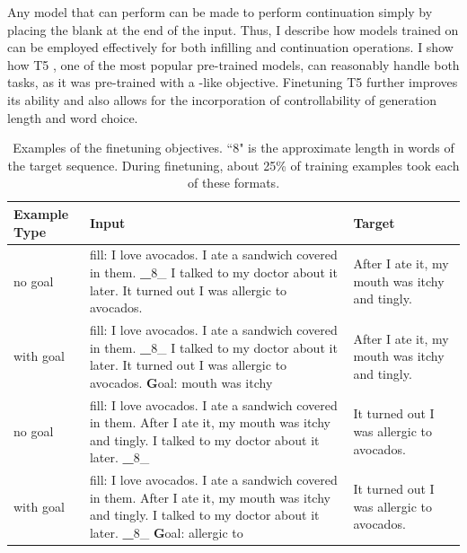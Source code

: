 Any model that can perform \FitB{} can be made to perform continuation simply by placing the blank at the end of the input.
Thus, I describe how models trained on \FitB{} can be employed effectively for both infilling and continuation operations.
I show how T5 \citep{raffel2019exploring}, one of the most popular pre-trained models, can reasonably handle both tasks, as it was pre-trained with a \FitB-like objective.
Finetuning T5 further improves its ability and also allows for the incorporation of controllability of generation length and word choice.


\begin{table}[t]
  \centering
  \small
  \caption{Examples of the finetuning objectives. ``8" is the approximate length in words of the target sequence. During finetuning, about 25\% of training examples took each of these formats.}
    \begin{tabular}{p{}p{}p{}}
    \midrule
    Example Type & Input & Target \\
    \midrule
     \cFITB{} no goal & fill: I love avocados. I ate a sandwich covered in them. {\textbf \_8\_} I talked to my doctor about it later. It turned out I was allergic to avocados. & After I ate it, my mouth was itchy and tingly. \\
    \midrule
     \cFITB{}  with goal & fill: I love avocados. I ate a sandwich covered in them.  {\textbf \_8\_} I talked to my doctor about it later. It turned out I was allergic to avocados.  {\textbf Goal: mouth was itchy} & After I ate it, my mouth was itchy and tingly. \\
    \midrule
     \cFITB{} no goal& fill: I love avocados. I ate a sandwich covered in them. After I ate it, my mouth was itchy and tingly. I talked to my doctor about it later.  {\textbf \_8\_}  & It turned out I was allergic to avocados. \\
    \midrule
     \cFITE{} with goal & fill: I love avocados. I ate a sandwich covered in them. After I ate it, my mouth was itchy and tingly. I talked to my doctor about it later.  {\textbf \_8\_}   {\textbf Goal: allergic to} & It turned out I was allergic to avocados. \\
    \midrule
    \end{tabular}
  \label{tab:task_examples}
\end{table}%

